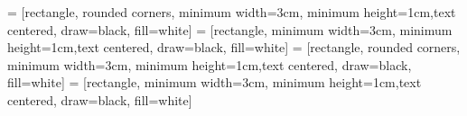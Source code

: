  = [rectangle, rounded corners, minimum width=3cm, minimum height=1cm,text centered, draw=black, fill=white]
 = [rectangle, minimum width=3cm, minimum height=1cm,text centered, draw=black, fill=white]
 = [rectangle, rounded corners, minimum width=3cm, minimum height=1cm,text centered, draw=black, fill=white]
 = [rectangle, minimum width=3cm, minimum height=1cm,text centered, draw=black, fill=white]

